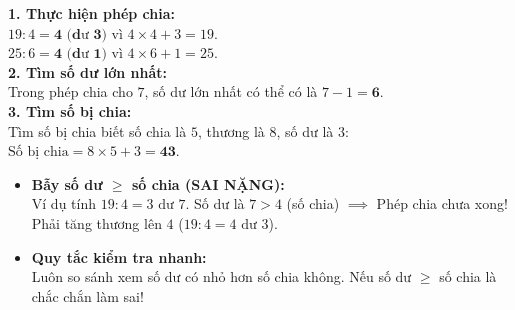\documentclass[12pt,a4paper]{article}
\begin{document}
\vspace{-2.5mm}
\noindent
\begin{minipage}[t]{0.49\textwidth}\vspace{0pt}
\begin{tcolorbox}[
  enhanced,
  colback=green!4!white,
  colframe=green!60!black,
  arc=2mm, boxrule=0.8pt,
  left=2mm, right=2mm, top=1.8mm, bottom=1.8mm,
  title={\footnotesize\bfseries\color{white}\faCheckCircle\ Ví dụ thực hành chuẩn mực}
]
{\footnotesize
\textbf{1. Thực hiện phép chia:}\\
$19 : 4 = \mathbf{4\text{ (dư 3)}}$ vì $4 \times 4 + 3 = 19$.\\
$25 : 6 = \mathbf{4\text{ (dư 1)}}$ vì $4 \times 6 + 1 = 25$.\\
\textbf{2. Tìm số dư lớn nhất:}\\
Trong phép chia cho $7$, số dư lớn nhất có thể có là $7 - 1 = \mathbf{6}$.\\
\textbf{3. Tìm số bị chia:}\\
Tìm số bị chia biết số chia là $5$, thương là $8$, số dư là $3$:\\
$\text{Số bị chia} = 8 \times 5 + 3 = \mathbf{43}$.
}
\end{tcolorbox}
\end{minipage}
\hfill
\begin{minipage}[t]{0.49\textwidth}\vspace{0pt}
\begin{tcolorbox}[
  enhanced,
  colback=red!4!white,
  colframe=red!70!black,
  arc=2mm, boxrule=0.8pt,
  left=2mm, right=2mm, top=1.8mm, bottom=1.8mm,
  title={\footnotesize\bfseries\color{white}\faExclamationTriangle\ Mẹo tránh bẫy trắc nghiệm}
]
{\footnotesize
\begin{itemize}\setlength{\itemsep}{1.5pt}\setlength{\leftskip}{-2.5mm}
  \item \textbf{Bẫy số dư $\ge$ số chia (SAI NẶNG):}\\
  Ví dụ tính $19 : 4 = 3\text{ dư } 7$. Số dư là $7 > 4$ (số chia) $\implies$ Phép chia chưa xong! Phải tăng thương lên $4$ ($19 : 4 = 4\text{ dư } 3$).
  \item \textbf{Quy tắc kiểm tra nhanh:}\\
  Luôn so sánh xem số dư có nhỏ hơn số chia không. Nếu số dư $\ge$ số chia là chắc chắn làm sai!
\end{itemize}
}
\end{tcolorbox}
\end{minipage}
\end{document}
